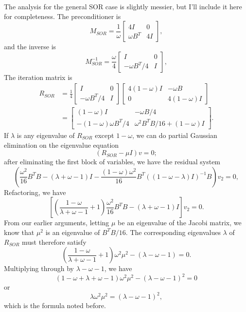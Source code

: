 \documentclass[12pt, leqno]{article} %
\begin{document}
The analysis for the general SOR case is slightly messier, but I'll
include it here for completeness.  The preconditioner is
\[
  M_{SOR} = \frac{1}{\omega}
  \begin{bmatrix} 4I & 0 \\ \omega B^T & 4I \end{bmatrix},
\]
and the inverse is
\[
  M_{SOR}^{-1} =
  \frac{\omega}{4} \begin{bmatrix} I & 0 \\ -\omega B^T/4 & I \end{bmatrix},
\]
The iteration matrix is
\begin{align*}
  R_{SOR} &=
  \frac{1}{4} \begin{bmatrix} I & 0 \\ -\omega B^T/4 & I \end{bmatrix}
  \begin{bmatrix} 4(1-\omega) I & -\omega B \\ 0 & 4(1-\omega) I \end{bmatrix} \\
  &=
  \begin{bmatrix}
    (1-\omega) I & -\omega B/4 \\
    -(1-\omega) \omega B^T/4 & \omega^2 B^T B/16 + (1-\omega) I
  \end{bmatrix}.
\end{align*}
If $\lambda$ is any eigenvalue of $R_{SOR}$ except $1-\omega$, we can do
partial Gaussian elimination on the eigenvalue equation
\[
  (R_{SOR}-\mu I) v = 0;
\]
after eliminating the first block of variables, we have the residual system
\[
  \left(\frac{\omega^2}{16} B^T B-(\lambda+\omega-1) I - \frac{(1-\omega)\omega^2}{16} B^T ((1-\omega-\lambda) I)^{-1} B\right)
v_2 = 0,
\]
Refactoring, we have
\[
  \left[
\left( \frac{1-\omega}{\lambda+\omega-1} + 1 \right)
  \frac{\omega^2}{16} B^T B - (\lambda+\omega-1) I \right] v_2 = 0.
\]
From our earlier arguments, letting $\mu$ be an eigenvalue of the
Jacobi matrix, we know that $\mu^2$ is an eigenvalue of $B^T B/16$.  The
corresponding eigenvalues $\lambda$ of $R_{SOR}$ must therefore
satisfy
\[
  \left( \frac{1-\omega}{\lambda+\omega-1} + 1 \right) \omega^2 \mu^2 - (\lambda-\omega-1) = 0.
\]
Multiplying through by $\lambda-\omega-1$, we have
\[
  (1-\omega + \lambda + \omega - 1) \omega^2 \mu^2 -
  (\lambda-\omega-1)^2 = 0
\]
or
\[
 \lambda \omega^2 \mu^2 = (\lambda - \omega - 1)^2,
\]
which is the formula noted before.
\end{document}
